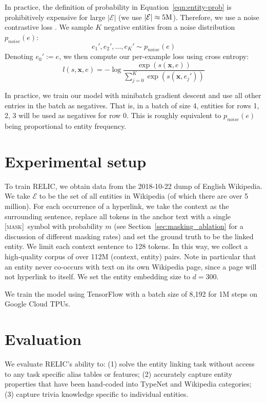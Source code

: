 \documentclass{article} \usepackage{iclr2020_conference,times}
\newcommand{\blank}{\textsc{[mask]}}
\newcommand{\ctx}{\mathbf{x}}
\newcommand{\ack}{RELIC\xspace}
\begin{document}
In practice, the definition of probability in Equation~\ref{eqn:entity-prob} is prohibitively expensive for large $|\mathcal{E}|$ (we use $|\mathcal{E}| \approx 5{\rm M}$). 
Therefore, we use a noise contrastive loss \citep{gutmann2012noise, mnih2013learning}.
We sample $K$ negative entities from a noise distribution $p_{noise}(e)$:
\begin{equation}
e_1', e_2', \ldots, e_K' \sim p_{noise}(e)
\end{equation}
Denoting $e_0' := e$, we then compute our per-example loss using cross entropy:
\begin{equation}
\label{eqn:batch_loss}
    l(s, \ctx, e) = - \log \frac{\exp(s(\ctx, e))}{
    \sum_{j=0}^K \exp(s(\ctx, e_j'))}
\end{equation}



In practice, we train our model with minibatch gradient descent and use all other entries in the batch as negatives.
That is, in a batch of size 4, entities for rows 1, 2, 3 will be used as negatives for row 0. This is roughly equivalent to $p_{noise}(e)$ being proportional to entity frequency.


 


\section{Experimental setup}
\label{sec:implementation}

To train \ack, we obtain data from the 2018-10-22 dump of English Wikipedia. We take $\mathcal{E}$ to be the set of all entities in Wikipedia (of which there are over 5 million).
For each occurrence of a hyperlink, we take the context as the surrounding sentence, replace all tokens in the anchor text with a single \blank~symbol with probability $m$ (see Section~\ref{sec:masking_ablation} for a discussion of different masking rates) and set the ground truth to be the linked entity.
We limit each context sentence to 128 tokens.
In this way, we collect a high-quality corpus of over 112M (context, entity) pairs.
Note in particular that an entity never co-occurs with text on its own Wikipedia page, since a page will not hyperlink to itself.
We set the entity embedding size to $d = 300$. 

We train the model using TensorFlow \citep{abadi2016tensorflow} with a batch size of 8,192 for 1M steps on Google Cloud TPUs. 


\section{Evaluation} \label{sec:evaluation}
We evaluate \ack's ability to: (1) solve the entity linking task without access to any task specific alias tables or features; (2) accurately capture entity properties that have been hand-coded into TypeNet and Wikipedia categories; (3) capture trivia knowledge specific to individual entities.
\end{document}
